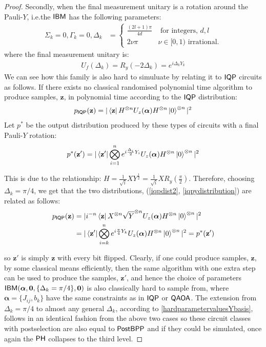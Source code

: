 \begin{proof}
Secondly, when the final measurement unitary is a rotation around the Pauli-$Y$, i.e.\@ the $\textsf{IBM}$ has the following parameters:
\begin{align}
        \Sigma_k = 0, \Gamma_k = 0, \Delta_k &=  
        \begin{cases}
            \frac{(2l+1)\pi}{4d} &\text{ for integers, } d, l\\
            2\nu \pi& \nu \in[0,1) \text{ irrational.}
        \end{cases}\label{hardparametervaluesYbasis}
\end{align}
where the final measurement unitary is:
\begin{align}
U_f(\Delta_k) = R_y(-2\Delta_{k}) =  e^{i\Delta_{k} Y_k} \label{yrotation}
\end{align}
We can see how this family is also hard to simuluate by relating it to $\operatorname{\textsf{IQP}}$ circuits as follows. If there exists no classical randomised polynomial time algorithm to produce samples, $\mathbf{z}$, in polynomial time according to the $\operatorname{\textsf{IQP}}$ distribution:
\begin{align}
p_{\operatorname{\textsf{IQP}}}(\mathbf{z}) = |\bra{\mathbf{z}}H^{\otimes n}U_z(\boldsymbol\alpha) H^{\otimes n}\ket{0}^{\otimes n}|^2 \label{iqpdist2}
\end{align}
Let $p^*$ be the output distribution produced by these types of circuits with a final Pauli-$Y$ rotation:
\begin{align}
p^*(\mathbf{z}') = |\bra{\mathbf{z}'}\bigotimes\limits_{i=1}^n e^{i\frac{\Delta_i}{2} Y_i}U_z(\boldsymbol\alpha) H^{\otimes n}\ket{0}^{\otimes n}|^2 \label{iqpydistribution}
\end{align}

This is due to the relationship: $H  =\frac{1}{\sqrt{i}}XY^{\frac{1}{2}} = \frac{1}{\sqrt{i}}XR_y(\frac{\pi}{2})$. Therefore, choosing $\Delta_k = \pi/4$, we get that the two distributions, (\eqref{iqpdist2}, \eqref{iqpydistribution}) are related as follows:
\begin{align}
p_{\operatorname{\textsf{IQP}}}(\mathbf{z}) &= |i^{-n}\bra{\mathbf{z}}X^{\otimes n}\sqrt{Y}^{\otimes n}U_z(\boldsymbol\alpha) H^{\otimes n}\ket{0}^{\otimes n}|^2\\
&= |\bra{\mathbf{z}'}\bigotimes\limits_{i=k}^ne^{i\frac{\pi}{4} Y_k}U_z(\boldsymbol\alpha) H^{\otimes n}\ket{0}^{\otimes n}|^2  = p^*(\mathbf{z}')
\end{align}

so $\mathbf{z}'$ is simply $\mathbf{z}$ with every bit flipped. Clearly, if one could produce samples, $\mathbf{z}$, by some classical means efficiently, then the same algorithm with one extra step can be used to produce the samples, $\mathbf{z}'$, and hence the choice of parameters $\textsf{IBM}(\boldsymbol\alpha, \mathbf{0}, \{\Delta_k = \pi/4\},\mathbf{0})$ is also classically hard to sample from, where $\boldsymbol\alpha = \{ J_{ij}, b_{k}\}$ have the same constraints as in $\operatorname{\textsf{IQP}}$ or $\operatorname{\textsf{QAOA}}$. The extension from $\Delta_k = \pi/4$ to almost any general $\Delta_k$, according to \eqref{hardparametervaluesYbasis}, follows in an identical fashion from the above two cases so these circuit classes with postselection are also equal to $\operatorname{\textsf{PostBPP}}$ and if they could be simulated, once again the $\operatorname{\textsf{PH}}$ collapses to the third level.


\end{proof}
